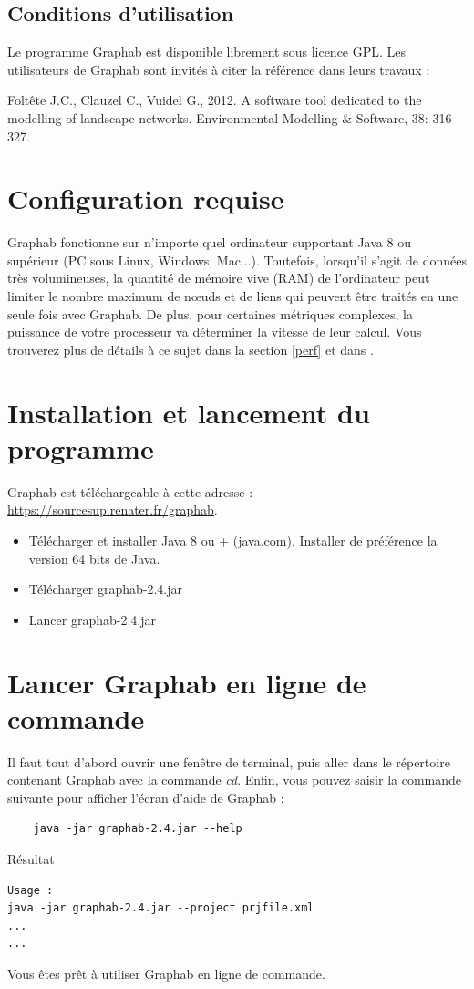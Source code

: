 \documentclass[a4paper,10pt]{report}
\begin{document}
\subsection{Conditions d’utilisation}
Le programme Graphab est disponible librement sous licence GPL. Les utilisateurs de Graphab sont invités à citer la référence \cite{2012_graphab_EMS} dans leurs travaux :

Foltête J.C., Clauzel C., Vuidel G., 2012. A software tool dedicated to the modelling of landscape networks. Environmental Modelling \& Software, 38: 316-327.


\section{Configuration requise}

Graphab fonctionne sur n'importe quel ordinateur supportant Java 8 ou supérieur (PC sous Linux, Windows, Mac...). Toutefois, lorsqu'il s'agit de données très volumineuses, la quantité de mémoire vive (RAM) de l’ordinateur peut limiter le nombre maximum de nœuds et de liens qui peuvent être traités en une seule fois avec Graphab. De plus, pour certaines métriques complexes, la puissance de votre processeur va déterminer la vitesse de leur calcul. Vous trouverez plus de détails à ce sujet dans la section \ref{perf} et dans \cite{2012_graphab_EMS}.

\section{Installation et lancement du programme}

Graphab est téléchargeable à cette adresse : \url{https://sourcesup.renater.fr/graphab}.

\begin{itemize}
	\item Télécharger et installer Java 8 ou + (\href{http://www.java.com}{java.com}). Installer de préférence la version 64 bits de Java.
	\item Télécharger graphab-2.4.jar
	\item Lancer graphab-2.4.jar
\end{itemize}

\section{Lancer Graphab en ligne de commande}
Il faut tout d'abord ouvrir une fenêtre de terminal, puis aller dans le répertoire contenant Graphab avec la commande \textit{cd}.
Enfin, vous pouvez saisir la commande suivante pour afficher l'écran d'aide de Graphab :
\begin{Verbatim}
	java -jar graphab-2.4.jar --help
\end{Verbatim}
Résultat
\begin{Verbatim}
Usage :
java -jar graphab-2.4.jar --project prjfile.xml
...
...
\end{Verbatim}
Vous êtes prêt à utiliser Graphab en ligne de commande.
\end{document}

